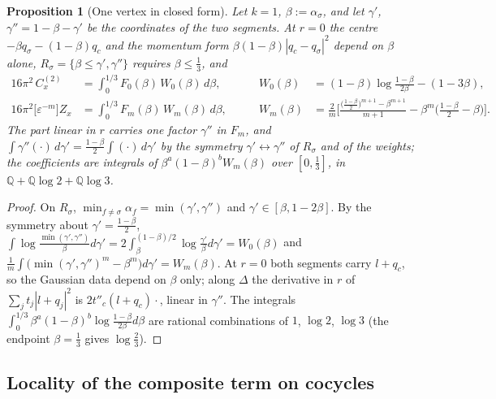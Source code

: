 \documentclass[11pt]{article}
\numberwithin{equation}{section}
\theoremstyle{plain}
\newtheorem{proposition}[theorem]{Proposition}
\theoremstyle{definition}
\begin{document}
\begin{proposition}[One vertex in closed form]
\label{prop:cc-k1}
Let $k=1$, $\beta:=\alpha_\sigma$, and let $\gamma'$, $\gamma''=1-\beta-\gamma'$ be the coordinates of the two segments. At $r=0$ the centre $-\beta q_\sigma-(1-\beta)q_c$ and the momentum form $\beta(1-\beta)|q_c-q_\sigma|^2$ depend on $\beta$ alone, $R_\sigma=\{\beta\le\gamma',\gamma''\}$ requires $\beta\le\tfrac13$, and
\[
\begin{aligned}
16\pi^2\,C^{(2)}_x&=\int_0^{1/3}F_0(\beta)\,W_0(\beta)\,d\beta,&\qquad W_0(\beta)&=(1-\beta)\log\frac{1-\beta}{2\beta}-(1-3\beta),\\
16\pi^2\big[\varepsilon^{-m}\big]Z_x&=\int_0^{1/3}F_m(\beta)\,W_m(\beta)\,d\beta,&\qquad W_m(\beta)&=\frac2m\Big[\frac{\big(\tfrac{1-\beta}2\big)^{m+1}-\beta^{m+1}}{m+1}-\beta^m\Big(\frac{1-\beta}2-\beta\Big)\Big].
\end{aligned}
\]
The part linear in $r$ carries one factor $\gamma''$ in $F_m$, and $\int\gamma''(\cdot)\,d\gamma'=\tfrac{1-\beta}2\int(\cdot)\,d\gamma'$ by the symmetry $\gamma'\leftrightarrow\gamma''$ of $R_\sigma$ and of the weights; the coefficients are integrals of $\beta^a(1-\beta)^bW_m(\beta)$ over $[0,\tfrac13]$, in $\mathbb Q+\mathbb Q\log2+\mathbb Q\log3$.
\end{proposition}

\begin{proof}
On $R_\sigma$, $\min_{f\ne\sigma}\alpha_f=\min(\gamma',\gamma'')$ and $\gamma'\in[\beta,1-2\beta]$. By the symmetry about $\gamma'=\tfrac{1-\beta}2$, $\int\log\frac{\min(\gamma',\gamma'')}\beta d\gamma'=2\int_\beta^{(1-\beta)/2}\log\frac{\gamma'}\beta d\gamma'=W_0(\beta)$ and $\frac1m\int\big(\min(\gamma',\gamma'')^m-\beta^m\big)d\gamma'=W_m(\beta)$. At $r=0$ both segments carry $l+q_c$, so the Gaussian data depend on $\beta$ only; along $\Delta$ the derivative in $r$ of $\sum_jt_j|l+q_j|^2$ is $2t''_c(l+q_c)\cdot$, linear in $\gamma''$. The integrals $\int_0^{1/3}\beta^a(1-\beta)^b\log\frac{1-\beta}{2\beta}d\beta$ are rational combinations of $1$, $\log2$, $\log3$ (the endpoint $\beta=\tfrac13$ gives $\log\tfrac23$).
\end{proof}

\subsection{Locality of the composite term on cocycles}
\end{document}
